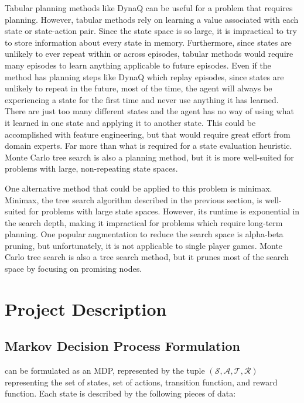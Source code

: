 \documentclass[letterpaper]{article} %
\begin{document}
Tabular planning methods like DynaQ can be useful for a problem that requires planning. However, tabular methods rely on learning a value associated with each state
or state-action pair. Since the state space is so large, it is impractical to try to store information about every state in memory. Furthermore, since states are unlikely to ever repeat within or across episodes, tabular methods would require many episodes to learn anything applicable to future episodes. Even if the method has planning steps like DynaQ which replay episodes, since states are unlikely to repeat in the future, most of the time, the agent will always be experiencing a state for the first time and never
use anything it has learned. There are just too many different states and the agent has no way of using what it learned in one state and applying it to another state. This could be accomplished with feature engineering, but that would require great effort from domain experts. Far more than what is required for a state evaluation heuristic. Monte Carlo tree search is also a planning method, but it is more well-suited for problems with large, non-repeating state spaces.

One alternative method that could be applied to this problem is minimax. Minimax, the tree search algorithm described in the previous section, is well-suited for problems with large state spaces. However, its runtime is exponential in the search depth, making it impractical for problems which require long-term planning. One popular augmentation to reduce the search space is alpha-beta pruning, but unfortunately, it is not applicable to single player games. Monte Carlo tree search is also a tree search method, but it prunes most of the search space by focusing on promising nodes.

\section{Project Description}

\subsection{Markov Decision Process Formulation}
\tetris{} can be formulated as an MDP, represented by the tuple \((\mathcal{S}, \mathcal{A}, \mathcal{T}, \mathcal{R})\) representing the set of states, set of actions, transition function, and reward function.
Each state is described by the following pieces of data:
\end{document}
